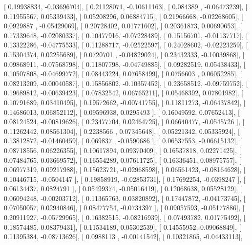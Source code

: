 \documentclass{article}
\begin{document}
       [ 0.19938834, -0.03696704],
       [ 0.21128071, -0.10611163],
       [ 0.084389  , -0.06473239],
       [ 0.11955567,  0.05339433],
       [ 0.05208296,  0.06884715],
       [ 0.21966668, -0.02268605],
       [ 0.0929887 , -0.05429069],
       [ 0.20728402,  0.01771602],
       [ 0.20361873,  0.00690653],
       [ 0.17339648, -0.02080337],
       [ 0.10477916, -0.07228489],
       [ 0.15156701, -0.01137717],
       [ 0.13322286, -0.04775533],
       [ 0.11288717, -0.02522597],
       [ 0.24028602, -0.02223259],
       [ 0.15304374,  0.02255689],
       [ 0.0720701 , -0.04829024],
       [ 0.23432333, -0.10039868],
       [ 0.09868911, -0.07568798],
       [ 0.11807798, -0.04749885],
       [ 0.09282519,  0.05438433],
       [ 0.10507808, -0.04699772],
       [ 0.08443224,  0.07658499],
       [ 0.0756603 ,  0.06052285],
       [ 0.08213209, -0.00040587],
       [ 0.15856802, -0.10357452],
       [ 0.23658512, -0.09759752],
       [ 0.19689812, -0.00639423],
       [ 0.07832542,  0.06765211],
       [ 0.05468392,  0.07801982],
       [ 0.10791689,  0.03410495],
       [ 0.19572662, -0.00741755],
       [ 0.11811273, -0.06437842],
       [ 0.14686013,  0.06852112],
       [ 0.09596938,  0.0295493 ],
       [ 0.16049592,  0.07652413],
       [ 0.08124524, -0.00819626],
       [ 0.23477704,  0.02464725],
       [ 0.06640477, -0.0545726 ],
       [ 0.11262442,  0.08561304],
       [ 0.2238566 ,  0.07345648],
       [ 0.05221342,  0.05335924],
       [ 0.13812872, -0.01460459],
       [ 0.069837  , -0.0590686 ],
       [ 0.06537553, -0.06615132],
       [ 0.08718556,  0.06226355],
       [ 0.10617894,  0.09370409],
       [ 0.16537818,  0.02271425],
       [ 0.07484765,  0.03669572],
       [ 0.16554289,  0.07611725],
       [ 0.16336451,  0.08975757],
       [ 0.06977319,  0.09217988],
       [ 0.15623721, -0.02968598],
       [ 0.06561423, -0.08164628],
       [ 0.10446715, -0.0504147 ],
       [ 0.19858919, -0.02853731],
       [ 0.17692254, -0.0398247 ],
       [ 0.06134437,  0.0824791 ],
       [ 0.05499374, -0.05016419],
       [ 0.12068638,  0.05528129],
       [ 0.06094248, -0.00203712],
       [ 0.11365763,  0.03820892],
       [ 0.17447872, -0.04173745],
       [ 0.07050057,  0.02940846],
       [ 0.08477754, -0.0734397 ],
       [ 0.09057593, -0.05177886],
       [ 0.20911927, -0.05729965],
       [ 0.16382515, -0.08216939],
       [ 0.07493782,  0.01775492],
       [ 0.18574485,  0.08379431],
       [ 0.11534189,  0.05302539],
       [ 0.14555952,  0.09068849],
       [ 0.11395384, -0.08713626],
       [ 0.0988113 , -0.00141542],
       [ 0.10321865, -0.04433113],
\end{document}

